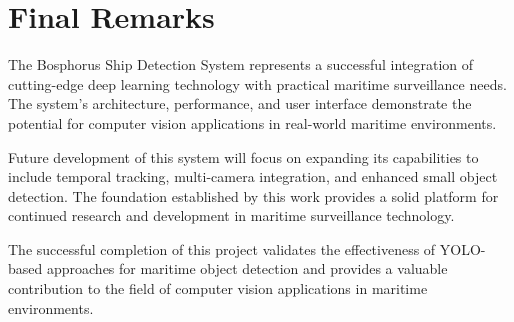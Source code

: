 \documentclass[12pt,a4paper]{report}
\begin{document}
\section{Final Remarks}
The Bosphorus Ship Detection System represents a successful integration of cutting-edge deep learning technology with practical maritime surveillance needs. The system's architecture, performance, and user interface demonstrate the potential for computer vision applications in real-world maritime environments.

Future development of this system will focus on expanding its capabilities to include temporal tracking, multi-camera integration, and enhanced small object detection. The foundation established by this work provides a solid platform for continued research and development in maritime surveillance technology.

The successful completion of this project validates the effectiveness of YOLO-based approaches for maritime object detection and provides a valuable contribution to the field of computer vision applications in maritime environments.
\end{document}
